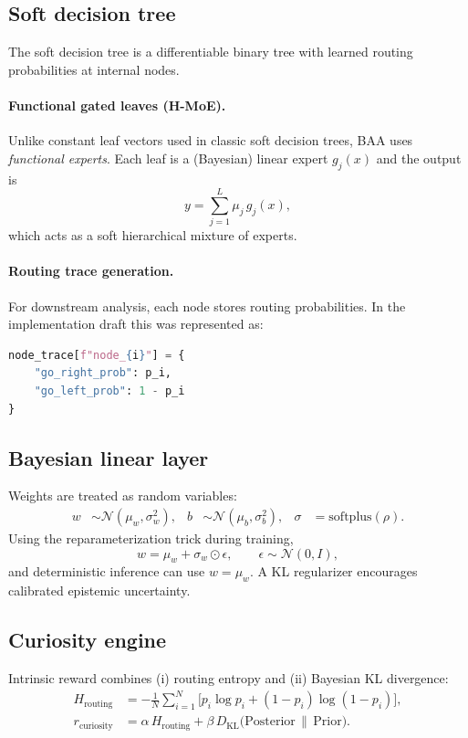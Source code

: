 \documentclass[11pt]{article}
\begin{document}
\subsection{Soft decision tree}
The soft decision tree is a differentiable binary tree with learned routing probabilities at internal nodes.

\paragraph{Functional gated leaves (H-MoE).}
Unlike constant leaf vectors used in classic soft decision trees, BAA uses \emph{functional experts}. Each leaf is a (Bayesian) linear expert $g_j(x)$ and the output is
\begin{equation}
 y = \sum_{j=1}^{L} \mu_j\, g_j(x),
\end{equation}
which acts as a soft hierarchical mixture of experts.

\paragraph{Routing trace generation.}
For downstream analysis, each node stores routing probabilities. In the implementation draft this was represented as:
\begin{lstlisting}[language=Python]
node_trace[f"node_{i}"] = {
    "go_right_prob": p_i,
    "go_left_prob": 1 - p_i
}
\end{lstlisting}

\subsection{Bayesian linear layer}
Weights are treated as random variables:
\begin{align}
 w &\sim \mathcal{N}(\mu_w,\sigma_w^2), & b &\sim \mathcal{N}(\mu_b,\sigma_b^2), & \sigma &= \mathrm{softplus}(\rho).
\end{align}
Using the reparameterization trick during training,
\begin{equation}
 w = \mu_w + \sigma_w \odot \epsilon, \qquad \epsilon \sim \mathcal{N}(0,I),
\end{equation}
and deterministic inference can use $w=\mu_w$. A KL regularizer encourages calibrated epistemic uncertainty.

\subsection{Curiosity engine}
Intrinsic reward combines (i) routing entropy and (ii) Bayesian KL divergence:
\begin{align}
H_{\mathrm{routing}} &= -\frac{1}{N}\sum_{i=1}^{N}\bigl[p_i\log p_i + (1-p_i)\log(1-p_i)\bigr],\\
r_{\mathrm{curiosity}} &= \alpha\, H_{\mathrm{routing}} + \beta\, D_{\mathrm{KL}}\bigl(\text{Posterior}\,\|\,\text{Prior}\bigr).
\end{align}
\end{document}
